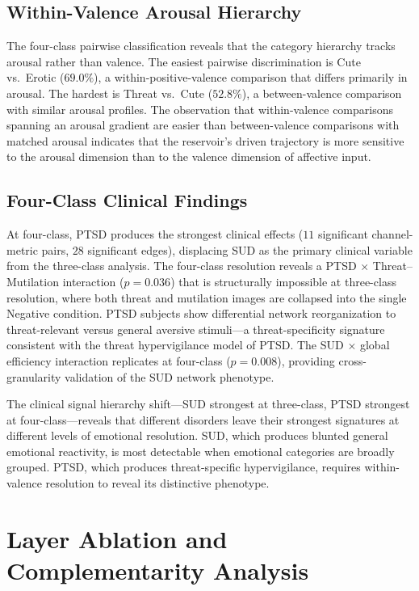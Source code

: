 \subsection{Within-Valence Arousal Hierarchy}

The four-class pairwise classification reveals that the category hierarchy tracks arousal rather than valence. The easiest pairwise discrimination is Cute vs.\ Erotic ($69.0\%$), a within-positive-valence comparison that differs primarily in arousal. The hardest is Threat vs.\ Cute ($52.8\%$), a between-valence comparison with similar arousal profiles. The observation that within-valence comparisons spanning an arousal gradient are easier than between-valence comparisons with matched arousal indicates that the reservoir's driven trajectory is more sensitive to the arousal dimension than to the valence dimension of affective input.

\subsection{Four-Class Clinical Findings}

At four-class, PTSD produces the strongest clinical effects ($11$ significant channel-metric pairs, $28$ significant edges), displacing SUD as the primary clinical variable from the three-class analysis. The four-class resolution reveals a PTSD $\times$ Threat--Mutilation interaction ($p = 0.036$) that is structurally impossible at three-class resolution, where both threat and mutilation images are collapsed into the single Negative condition. PTSD subjects show differential network reorganization to threat-relevant versus general aversive stimuli---a threat-specificity signature consistent with the threat hypervigilance model of PTSD. The SUD $\times$ global efficiency interaction replicates at four-class ($p = 0.008$), providing cross-granularity validation of the SUD network phenotype.

The clinical signal hierarchy shift---SUD strongest at three-class, PTSD strongest at four-class---reveals that different disorders leave their strongest signatures at different levels of emotional resolution. SUD, which produces blunted general emotional reactivity, is most detectable when emotional categories are broadly grouped. PTSD, which produces threat-specific hypervigilance, requires within-valence resolution to reveal its distinctive phenotype.


\section{Layer Ablation and Complementarity Analysis}
\label{sec:ch5_ablation}

